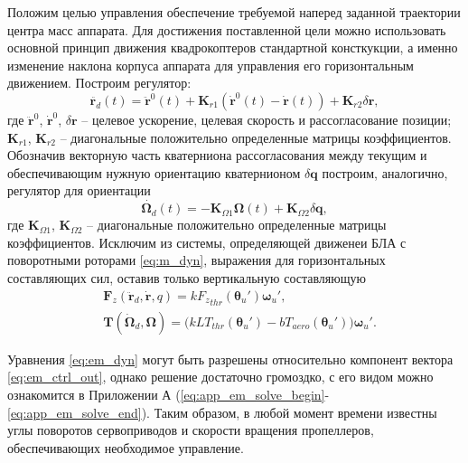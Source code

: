 Положим целью управления обеспечение требуемой наперед заданной траектории центра масс аппарата.
Для достижения поставленной цели можно использовать основной принцип движения квадрокоптеров стандартной консткукции, а именно изменение наклона корпуса аппарата для управления его горизонтальным движением. Построим регулятор:
\begin{equation} \label{eq:em_reg_r}
\ddot{\bm{r}_d}(t)=
\ddot{\bm{r}}^0(t)+\bm{K}_{r1}(\dot{\bm{r}}^0(t)-\dot{\bm{r}}(t))+\bm{K}_{r2}\delta \bm r,
\end{equation}
где 
$\ddot{\bm{r}}^0$, $\dot{\bm{r}}^0$, $\delta \bm r$ -- целевое ускорение, целевая скорость и рассогласование позиции;
$\bm K_{r1}$, $\bm K_{r2}$ 
-- диагональные положительно определенные матрицы коэффициентов.
Обозначив векторную часть кватерниона рассогласования между текущим и обеспечивающим нужную ориентацию кватернионом
$\delta \bm q$
построим, аналогично, регулятор для ориентации
\begin{equation} \label{eq:em_reg_q}
\dot{\bm{\Omega}_d}(t)=
-\bm{K}_{\Omega1}\bm{\Omega}(t)+\bm{K}_{\Omega2}\delta\bm{q},
\end{equation}
где $\bm K_{\Omega1}$, $\bm K_{\Omega2}$ 
-- диагональные положительно определенные матрицы коэффициентов.
Исключим из системы, определяющей движенеи БЛА с поворотными роторами \eqref{eq:m_dyn}, выражения для горизонтальных составляющих сил, оставив только вертикальную составляющую
\begin{equation} \label{eq:em_dyn}
\begin{aligned}
&\bm F_z(\ddot{\bm r}_d, \dot{\bm r}, q) = k {F_z}_{thr} (\bm \theta_u') \bm \omega_u',\\
&\bm T(\dot{\bm \Omega}_d, \bm\Omega) = \Big(
kLT_{thr}(\bm\theta_u') - bT_{aero}(\bm\theta_u')
\Big)
\bm \omega_u'.
\end{aligned}
\end{equation}

Уравнения \eqref{eq:em_dyn} могут быть разрешены относительно компонент вектора \eqref{eq:em_ctrl_out}, однако решение достаточно громоздко, с его видом можно ознакомится в Приложении А (\ref{eq:app_em_solve_begin}-\ref{eq:app_em_solve_end}).  Таким образом, в любой момент времени известны углы поворотов сервоприводов и скорости вращения пропеллеров, обеспечивающих необходимое управление.

